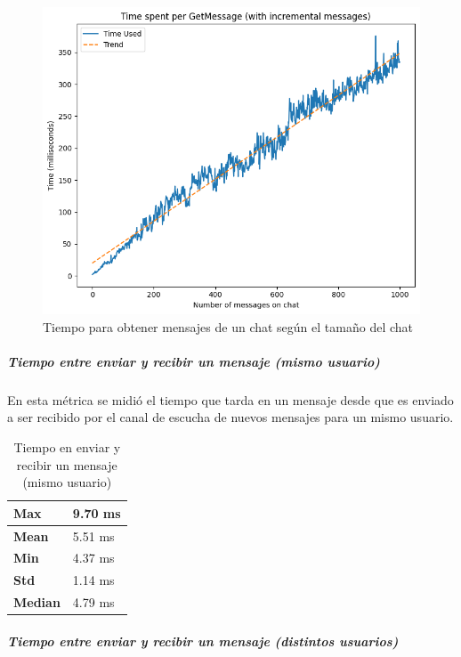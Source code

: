 \begin{figure}[h!]
    \centering
    \includegraphics[width=1\linewidth]{img/blockchain-get-message-graphic.png}
    \caption{Tiempo para obtener mensajes de un chat según el tamaño del chat}
    \label{fig:blockchain-get-message-graphic.png}
\end{figure}

\subparagraph{Tiempo entre enviar y recibir un mensaje (mismo usuario)}

En esta métrica se midió el tiempo que tarda en un mensaje desde que es enviado a ser recibido por el canal de escucha de nuevos mensajes para un mismo usuario.

\setlength\tabcolsep{1pt}
\begin{table}[!htbp]
    \centering
    \begin{tabular}{|m{5em}|m{5em}|}
    \hline
    \textbf{Max} & 9.70 ms \\
    \hline
    \textbf{Mean} & 5.51 ms \\
    \hline
    \textbf{Min} & 4.37 ms \\
    \hline
    \textbf{Std} & 1.14 ms \\
    \hline
    \textbf{Median} & 4.79 ms \\
    \hline
    \end{tabular}
    \caption{Tiempo en enviar y recibir un mensaje (mismo usuario)}
\end{table}

\subparagraph{Tiempo entre enviar y recibir un mensaje (distintos usuarios)}

